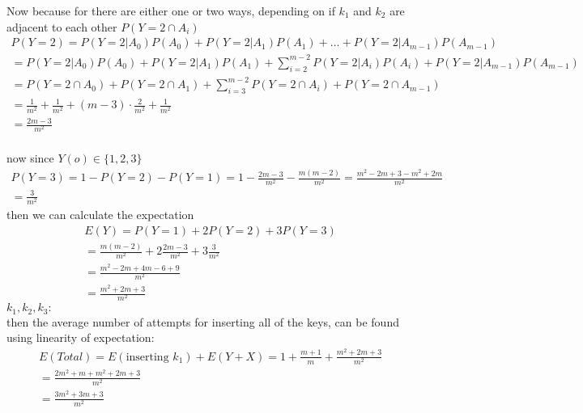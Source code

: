 \documentclass{report}
\begin{document}
Now because for there are either one or two ways, depending on if $k_{1}$ and $k_{2}$ are adjacent to each other
$P(Y = 2 \cap A_{i})$
\begin{gather*}
    P(Y = 2) = P(Y = 2 | A_{0})P(A_{0}) + P(Y = 2 | A_{1})P(A_{1}) + \hdots + P(Y = 2 | A_{m-1})P(A_{m-1})\\
    = P(Y = 2 | A_{0})P(A_{0}) + P(Y = 2 | A_{1})P(A_{1}) + \sum_{i=2}^{m-2}P(Y = 2 | A_{i})P(A_{i}) + P(Y = 2 | A_{m-1})P(A_{m-1})\\
    = P(Y = 2 \cap A_{0}) + P(Y = 2 \cap A_{1})+ \sum_{i=3}^{m-2} P(Y = 2 \cap A_{i}) +P(Y = 2 \cap A_{m-1})\\
    = \frac{1}{m^{2}} + \frac{1}{m^{2}} + (m-3)\cdot \frac{2}{m^{2}}+ \frac{1}{m^{2}}\\
    = \frac{2m - 3}{m^{2}}\\
\end{gather*}

now since $Y(o) \in \{1,2,3\}$
\begin{gather*}
    P(Y = 3) = 1 - P(Y = 2) - P(Y = 1) = 1 - \frac{2m - 3}{m^{2}} - \frac{m(m-2)}{m^{2}} = \frac{m^{2} - 2m + 3 - m^{2} +2m}{m^{2}} \\
    = \frac{3}{m^{2}}
\end{gather*}
then we can calculate the expectation
\begin{gather*}
    E(Y) = P(Y=1) + 2P(Y =2) + 3P(Y = 3)\\
    = \frac{m(m-2)}{m^{2}} + 2\frac{2m-3}{m^{2}} + 3\frac{3}{m^{2}}\\
    = \frac{m^{2} - 2m + 4m -6 + 9}{m^{2}}\\
    = \frac{m^{2} +2m +3}{m^{2}}
\end{gather*}
\medskip
$k_{1},k_{2},k_{3}:$\\
then the average number of attempts for inserting all of the keys, can be found using linearity of expectation:
\begin{gather*}
    E(Total) = E(\text{inserting $k_{1}$}) + E(Y + X) = 1 + \frac{m+1}{m} + \frac{m^{2} + 2m + 3}{m^{2}}\\
    = \frac{2m^{2} + m + m^{2} + 2m + 3}{m^{2}} \\
    = \frac{3m^{2} + 3m + 3}{m^{2}} 
\end{gather*}
\end{document}
